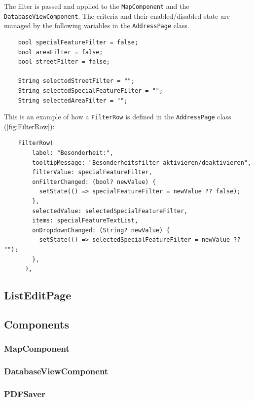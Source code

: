 The filter is passed and applied to the \texttt{MapComponent} and the \texttt{DatabaseViewComponent}. The criteria and their enabled/disabled state are managed by the following variables in the \texttt{AddressPage} class.
\lstset{style=mycsharp, caption=Filter variables in AddressPage}
\begin{lstlisting}
    bool specialFeatureFilter = false;
    bool areaFilter = false;
    bool streetFilter = false;
    
    String selectedStreetFilter = "";
    String selectedSpecialFeatureFilter = "";
    String selectedAreaFilter = "";
\end{lstlisting}

This is an example of how a \texttt{FilterRow} is defined in the \texttt{AddressPage} class (\ref{fig:FilterRow}):
\lstset{style=mycsharp, caption=FilterRow in AddressPage}
\begin{lstlisting}
    FilterRow(
        label: "Besonderheit:",
        tooltipMessage: "Besonderheitsfilter aktivieren/deaktivieren",
        filterValue: specialFeatureFilter,
        onFilterChanged: (bool? newValue) {
          setState(() => specialFeatureFilter = newValue ?? false);
        },
        selectedValue: selectedSpecialFeatureFilter,
        items: specialFeatureTextList,
        onDropdownChanged: (String? newValue) {
          setState(() => selectedSpecialFeatureFilter = newValue ?? "");
        },
      ),
\end{lstlisting}




 

\subsection{ListEditPage}


\subsection{Components}


\subsubsection{MapComponent}

\subsubsection{DatabaseViewComponent}

\subsubsection{PDFSaver}

